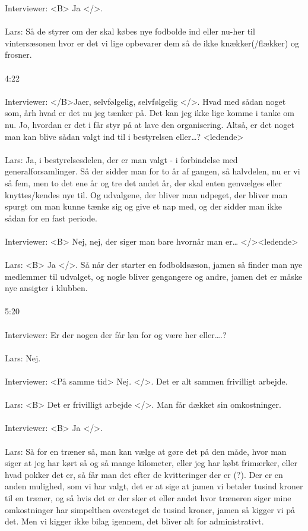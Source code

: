 Interviewer: <B> Ja </>.
\\\\
Lars: Så de styrer om der skal købes nye fodbolde ind eller nu-her til vintersæsonen hvor er det vi lige opbevarer dem så de ikke knækker(/flækker) og frosner.  
\\\\
4:22
\\\\
Interviewer: </B>Jaer, selvfølgelig, selvfølgelig </>. Hvad med sådan noget som, årh hvad er det nu jeg tænker på. Det kan jeg ikke lige komme i tanke om nu. Jo, hvordan er det i får styr på at lave den organisering. Altså, er det noget man kan blive sådan valgt ind til i bestyrelsen eller…? <ledende>
\\\\
Lars: Ja, i bestyrelsesdelen, der er man valgt - i forbindelse med generalforsamlinger. Så der sidder man for to år af gangen, så halvdelen, nu er vi så fem, men to det ene år og tre det andet år, der skal enten genvælges eller knyttes/kendes nye til. Og udvalgene, der bliver man udpeget, der bliver man spurgt om man kunne tænke sig og give et nap med, og der sidder man ikke sådan for en fast periode.
\\\\
Interviewer: <B> Nej, nej, der siger man bare hvornår man er… </><ledende>
\\\\
Lars: <B> Ja </>. Så når der starter en fodboldsæson, jamen så finder man nye medlemmer til udvalget, og nogle bliver gengangere og andre, jamen det er måske nye ansigter i klubben.
\\\\
5:20
\\\\
Interviewer: Er der nogen der får løn for og være her eller….?
\\\\
Lars: Nej.
\\\\
Interviewer: <På samme tid> Nej. </>. Det er alt sammen frivilligt arbejde.
\\\\
Lars: <B> Det er frivilligt arbejde </>. Man får dækket sin omkostninger.
\\\\
Interviewer: <B> Ja </>.
\\\\
Lars: Så for en træner så, man kan vælge at gøre det på den måde, hvor man siger at jeg har kørt så og så mange kilometer, eller jeg har købt frimærker, eller hvad pokker det er, så får man det efter de kvitteringer der er (?). Der er en anden mulighed, som vi har valgt, det er at sige at jamen vi betaler tusind kroner til en træner, og så hvis det er der sker et eller andet hvor træneren siger mine omkostninger har simpelthen oversteget de tusind kroner, jamen så kigger vi på det. Men vi kigger ikke bilag igennem, det bliver alt for administrativt.
